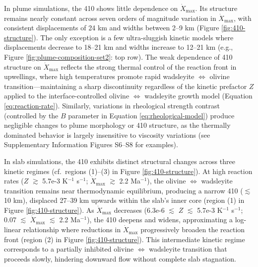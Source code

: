 \documentclass[draft,linenumbers]{agujournal2019}
\begin{document}
In plume simulations, the 410 shows little dependence on
\(\dot{X}_{\mathrm{max}}\). Its structure remains nearly constant across
seven orders of magnitude variation in \(\dot{X}_{\mathrm{max}}\), with
consistent displacements of 24 km and widths between 2--9 km (Figure
\ref{fig:410-structure}). The only exception is a few ultra-sluggish
kinetic models where displacements decrease to 18--21 km and widths
increase to 12--21 km (e.g., Figure \ref{fig:plume-composition-set2}:
top row). The weak dependence of 410 structure on
\(\dot{X}_{\mathrm{max}}\) reflects the strong thermal control of the
reaction front in upwellings, where high temperatures promote rapid
wadsleyite \(\Leftrightarrow\) olivine transition---maintaining a sharp
discontinuity regardless of the kinetic prefactor \(Z\) applied to the
interface-controlled olivine \(\Leftrightarrow\) wadsleyite growth model
(Equation \ref{eq:reaction-rate}). Similarly, variations in rheological
strength contrast (controlled by the \(B\) parameter in Equation
\ref{eq:rheological-model}) produce negligible changes to plume
morphology or 410 structure, as the thermally dominated behavior is
largely insensitive to viscosity variations (see Supplementary
Information Figures S6--S8 for examples).

In slab simulations, the 410 exhibits distinct structural changes across
three kinetic regimes (cf.~regions (1)--(3) in Figure
\ref{fig:410-structure}). At high reaction rates (\(Z\) \(\gtrsim\)
5.7e-3 K\(^{-1}\) s\(^{-1}\); \(\dot{X}_{\mathrm{max}}\) \(\gtrsim\) 2.2
Ma\(^{-1}\)), the olivine \(\Leftrightarrow\) wadsleyite transition
remains near thermodynamic equilibrium, producing a narrow 410
(\(\lesssim\) 10 km), displaced 27--39 km upwards within the slab's
inner core (region (1) in Figure \ref{fig:410-structure}). As
\(\dot{X}_{\mathrm{max}}\) decreases (6.3e-6 \(\lesssim\) \(Z\)
\(\lesssim\) 5.7e-3 K\(^{-1}\) s\(^{-1}\); 0.07 \(\lesssim\)
\(\dot{X}_{\mathrm{max}}\) \(\lesssim\) 2.2 Ma\(^{-1}\)), the 410
deepens and widens, approximating a log-linear relationship where
reductions in \(\dot{X}_{\mathrm{max}}\) progressively broaden the
reaction front (region (2) in Figure \ref{fig:410-structure}). This
intermediate kinetic regime corresponds to a partially inhibited olivine
\(\Leftrightarrow\) wadsleyite transition that proceeds slowly,
hindering downward flow without complete slab stagnation.
\end{document}
